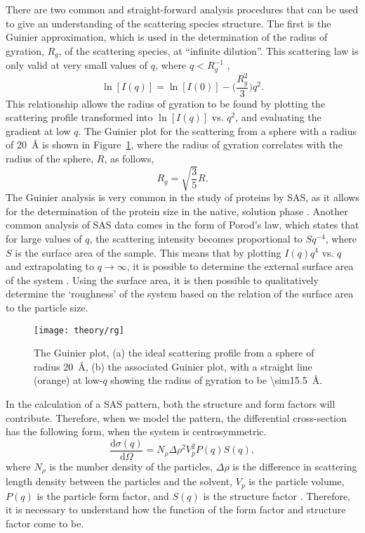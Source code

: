 There are two common and straight-forward analysis procedures that can be used to give an understanding of the scattering species structure.
The first is the Guinier approximation, which is used in the determination of the radius of gyration, $R_g$, of the scattering species, at ``infinite dilution''.
This scattering law is only valid at very small values of $q$, where $q < R_g^{-1}$ \cite{sivia_elementary_2011},
%
\begin{equation}
    \ln[I(q)] = \ln[I(0)] - \Bigg(\frac{R_g^2}{3}\Bigg)q^2.
\end{equation}
%
This relationship allows the radius of gyration to be found by plotting the scattering profile transformed into $\ln[I(q)]$ vs. $q^2$, and evaluating the gradient at low $q$.
The Guinier plot for the scattering from a sphere with a radius of \SI{20}{\angstrom} is shown in Figure~\ref{fig:rg}, where the radius of gyration correlates with the radius of the sphere, $R$, as follows,
%
\begin{equation}
    R_g = \sqrt{\frac{3}{5}}R.
\end{equation}
%
The Guinier analysis is very common in the study of proteins by SAS, as it allows for the determination of the protein size in the native, solution phase \cite{skou_synchrotron-based_2014}.
Another common analysis of SAS data comes in the form of Porod's law, which states that for large values of $q$, the scattering intensity becomes proportional to $Sq^{-4}$, where $S$ is the surface area of the sample.
This means that by plotting $I(q)q^4$ vs. $q$ and extrapolating to $q \rightarrow \infty$, it is possible to determine the external surface area of the system \cite{willis_experimental_2009}.
Using the surface area, it is then possible to qualitatively determine the `roughness' of the system based on the relation of the surface area to the particle size.
%
\begin{figure}
    \centering
    \texttt{[image: theory/rg]}
    \caption{The Guinier plot, (a) the ideal scattering profile from a sphere of radius \SI{20}{\angstrom}, (b) the associated Guinier plot, with a straight line (orange) at low-$q$ showing the radius of gyration to be \SI{\sim15.5}{\angstrom}.}
    \label{fig:rg}
\end{figure}
%

In the calculation of a SAS pattern, both the structure and form factors will contribute.
Therefore, when we model the pattern, the differential cross-section has the following form, when the system is centrosymmetric.
%
\begin{equation}
    \frac{\text{d}\sigma(q)}{\text{d}\Omega} = N_\rho\Delta\rho^2V_p^2 P(q)S(q),
\end{equation}
%
where $N_\rho$ is the number density of the particles, $\Delta\rho$ is the difference in scattering length density between the particles and the solvent, $V_p$ is the particle volume, $P(q)$ is the particle form factor, and $S(q)$ is the structure factor \cite{pedersen_monte_2002}.
Therefore, it is necessary to understand how the function of the form factor and structure factor come to be.


